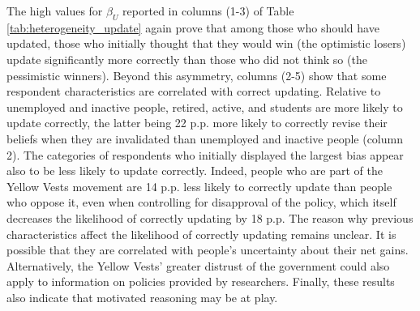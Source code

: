 \documentclass[12pt]{article} %
\begin{document}
\begin{appendices}
\noindent
The high values for $\beta_{U}$ reported in columns (1-3) of Table \ref{tab:heterogeneity_update} again prove that among those who should have updated, those who initially thought that they would win (the optimistic losers) update significantly more correctly than those who did not think so (the pessimistic winners). Beyond this asymmetry, columns (2-5) show that some respondent characteristics are correlated with correct updating. Relative to unemployed and inactive people, retired, active, and students are more likely to update correctly, the latter being 22 p.p. more likely to correctly revise their beliefs when they are invalidated than unemployed and inactive people (column 2). The categories of respondents who initially displayed the largest bias appear also to be less likely to update correctly. Indeed, people who are part of the Yellow Vests movement are 14 p.p. less likely to correctly update than people who oppose it, even when controlling for disapproval of the policy, which itself decreases the likelihood of correctly updating by 18 p.p. The reason why previous characteristics affect the likelihood of correctly updating remains unclear. It is possible that they are correlated with people's uncertainty about their net gains. Alternatively, the Yellow Vests' greater distrust of the government \citep[documented in][]{algan_et_al_19} could also apply to information on policies provided by researchers. Finally, these results also indicate that motivated reasoning may be at play.



\end{appendices}
\end{document}
